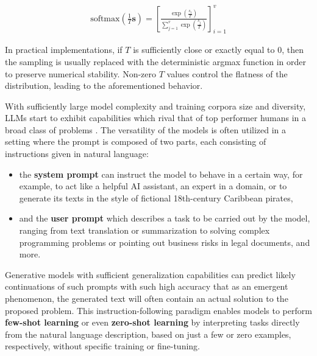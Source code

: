 \documentclass[noindent,nohyp,parspace,titlepage,twoside,12pt]{article}
\begin{document}
      \begin{align} \label{eqsoftmax}
        \text{softmax}\left(\frac{1}{T} \mathbf{s}\right)
          = \left[
              \frac{\exp(\frac{s_i}{T})}{\sum_{j=1}^v \exp(\frac{s_j}{T})}
            \right]_{i=1}^v
      \end{align}

      In practical implementations, if $T$ is sufficiently close or exactly
      equal to $0$, then the sampling is usually replaced with the
      deterministic argmax function in order to preserve numerical stability.
      Non-zero $T$ values control the flatness of the distribution, leading to
      the aforementioned behavior.

      With sufficiently large model complexity and training corpora size and
      diversity, LLMs start to exhibit capabilities which rival that of top
      performer humans in a broad class of problems \cite{gpt3,gpt4}. The
      versatility of the models is often utilized in a setting where the prompt
      is composed of two parts, each consisting of instructions given in
      natural language:

      \begin{itemize}
        \item the \textbf{system prompt} can instruct the model to behave in a
              certain way, for example, to act like a helpful AI assistant,
              an expert in a domain, or to generate its texts in the style of
              fictional 18th-century Caribbean pirates,

        \item and the \textbf{user prompt} which describes a task to be carried
              out by the model, ranging from text translation or summarization
              to solving complex programming problems or pointing out business
              risks in legal documents, and more.
      \end{itemize}

      Generative models with sufficient generalization capabilities can predict
      likely continuations of such prompts with such high accuracy that as an
      emergent phenomenon, the generated text will often contain an actual
      solution to the proposed problem. This instruction-following paradigm
      enables models to perform \textbf{few-shot learning} \cite{gpt3} or even
      \textbf{zero-shot learning} by interpreting tasks directly from the
      natural language description, based on just a few or zero examples,
      respectively, without specific training or fine-tuning.
\end{document}
